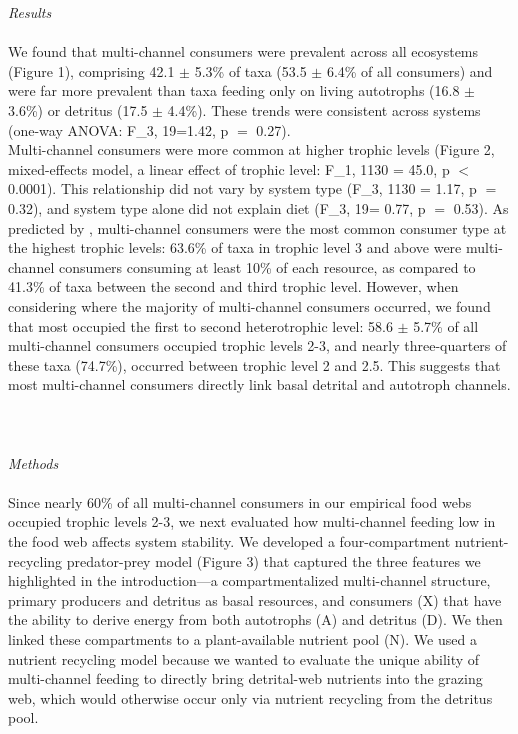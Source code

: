\documentclass[12pt,a4paper,oneside]{article}
\begin{document}
\emph{Results}\\
\\
\indent We found that multi-channel consumers were prevalent across all ecosystems
(Figure 1), comprising 42.1 ${\pm}$ 5.3\% of taxa (53.5 ${\pm}$ 6.4\%
of all consumers) and were far more
prevalent than taxa feeding only on living
autotrophs (16.8 ${\pm}$ 3.6\%) or detritus (17.5 ${\pm}$ 4.4\%). These
trends were consistent across systems (one-way ANOVA:
F_{3, 19}=1.42, p \(=\) 0.27).
\\
\indent Multi-channel consumers were more common at
higher trophic levels (Figure 2, mixed-effects model, a linear effect
of trophic level:
F_{1, 1130 }= 45.0, p \(<\) 0.0001). This relationship did not vary
by system type (F_{3, 1130 }= 1.17, p \(=\) 0.32), and system type
alone did not explain diet (F_{3, 19}=
0.77, p \(=\) 0.53). As predicted by \citet{Rooney:2006}, multi-channel consumers
were the most common consumer type at the highest trophic levels: 63.6\% of taxa
in trophic level 3 and above were multi-channel consumers consuming at
least 10\% of each resource, as compared to 41.3\% of taxa between the
second and third trophic level. However, when considering where the
majority of multi-channel consumers occurred, we found that most
occupied the first to second heterotrophic level: 58.6 ${\pm}$
5.7\% of all multi-channel consumers occupied trophic levels 2-3, and
nearly three-quarters of these taxa (74.7\%), occurred between trophic
level 2 and 2.5.
This suggests that most multi-channel consumers directly
link basal detrital and autotroph channels. 
\\
\\
\\
\\
\emph{Methods}\\
\\
\indent Since nearly 60\% of all multi-channel consumers in our
empirical food webs occupied
trophic levels 2-3, we next evaluated how multi-channel feeding low in the food
web affects system stability. We developed a four-compartment
nutrient-recycling predator-prey model (Figure 3) that captured the three features we highlighted in the introduction---a compartmentalized multi-channel structure, primary producers and detritus as basal resources, and consumers (X)
that have the ability to derive energy from both autotrophs (A) and detritus (D). We then linked these compartments to a
plant-available nutrient pool (N). We used a nutrient recycling model because we wanted to evaluate the unique ability of multi-channel feeding to directly bring detrital-web nutrients into the grazing web, which would otherwise occur only via nutrient recycling from the detritus pool. 
\end{document}
